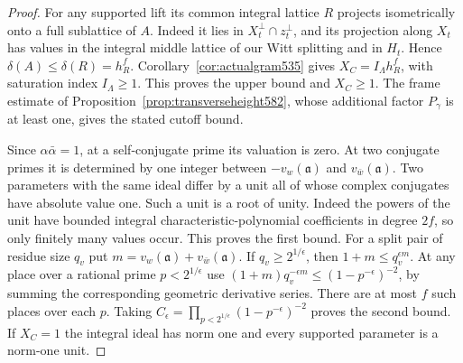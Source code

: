 \documentclass[a4paper,11pt]{article}
\theoremstyle{definition}
\theoremstyle{remark}
\numberwithin{equation}{section}
\begin{document}
\begin{proof}
For any supported lift its common integral lattice \(R\)
projects isometrically onto a full sublattice of \(A\).
Indeed it lies in \(X_t^\perp\cap z_t^\perp\), and its projection
along \(X_t\) has values in the integral middle lattice of our
Witt splitting and in \(H_t\). Hence
\(\delta(A)\le\delta(R)=h_R^f\). Corollary~\ref{cor:actualgram535}
gives \(X_C=I_\Lambda h_R^f\), with saturation index
\(I_\Lambda\ge1\). This proves the upper bound and \(X_C\ge1\).
The frame estimate of Proposition~\ref{prop:transverseheight582},
whose additional factor \(P_\gamma\) is at least one, gives the
stated cutoff bound.

Since \(\alpha\bar\alpha=1\), at a self-conjugate prime its
valuation is zero. At two conjugate primes it is determined by
one integer between \(-v_w(\mathfrak a)\) and
\(v_{\bar w}(\mathfrak a)\). Two parameters with the same ideal
differ by a unit all of whose complex conjugates have absolute
value one. Such a unit is a root of unity. Indeed the powers
of the unit have bounded integral characteristic-polynomial
coefficients in degree \(2f\), so only finitely many values occur.
This proves the first bound. For a split pair of residue size
\(q_v\) put \(m=v_w(\mathfrak a)+v_{\bar w}(\mathfrak a)\).
If \(q_v\ge 2^{1/\epsilon}\), then \(1+m\le q_v^{\epsilon m}\).
At any place over a rational prime \(p<2^{1/\epsilon}\) use
\((1+m)q_v^{-\epsilon m}\le(1-p^{-\epsilon})^{-2}\), by summing
the corresponding geometric derivative series. There are at most
\(f\) such places over each \(p\). Taking
\(C_\epsilon=\prod_{p<2^{1/\epsilon}}(1-p^{-\epsilon})^{-2}\)
proves the second bound. If \(X_C=1\) the integral ideal has norm
one and every supported parameter is a norm-one unit.
\end{proof}
\end{document}
